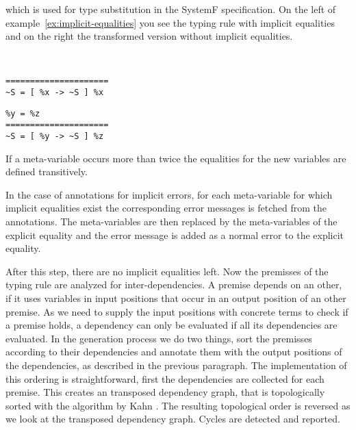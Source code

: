 which is used for type substitution in the SystemF specification. On
the left of example~\ref{ex:implicit-equalities} you see the typing
rule with implicit equalities and on the right the transformed version
without implicit equalities.

\begin{example}{~}
\newline
  \begin{minipage}[b]{.45\linewidth}
    \begin{verbatim}
=====================
~S = [ %x -> ~S ] %x
\end{verbatim}
  \end{minipage}
  \begin{minipage}[b]{.45\linewidth}
    \begin{verbatim}
%y = %z
=====================
~S = [ %y -> ~S ] %z
\end{verbatim}
  \end{minipage}
\label{ex:implicit-equalities}
\end{example}

If a meta-variable occurs more than twice the equalities for the new
variables are defined transitively.

In the case of annotations for implicit errors, for each meta-variable
for which implicit equalities exist the corresponding error messages
is fetched from the annotations. The meta-variables are then replaced
by the meta-variables of the explicit equality and the error message
is added as a normal error to the explicit equality.


After this step, there are no implicit equalities left. Now the
premisses of the typing rule are analyzed for inter-dependencies. A
premise depends on an other, if it uses variables in input positions
that occur in an output position of an other premise. As we need to
supply the input positions with concrete terms to check if a premise
holds, a dependency can only be evaluated if all its dependencies are
evaluated. In the generation process we do two things, sort the
premisses according to their dependencies and annotate them with the
output positions of the dependencies, as described in the previous
paragraph. The implementation of this ordering is straightforward,
first the dependencies are collected for each premise. This creates an
transposed dependency graph, that is topologically sorted with the
algorithm by Kahn \cite{Kahn:1962:TSL:368996.369025}. The resulting
topological order is reversed as we look at the transposed dependency
graph. Cycles are detected and reported.


